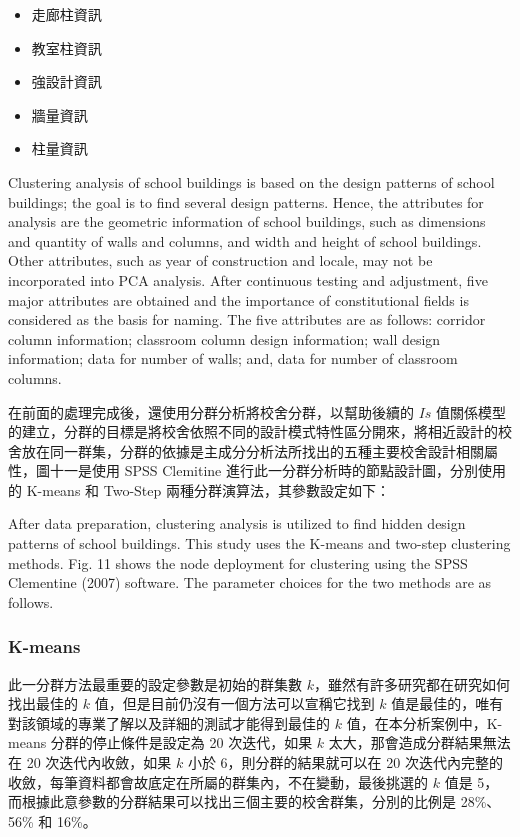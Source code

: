 \begin{itemize}
\item 走廊柱資訊
\item 教室柱資訊
\item 強設計資訊
\item 牆量資訊
\item 柱量資訊
\end{itemize}


Clustering analysis of school buildings is based on the design patterns of school buildings; the goal is to find several design patterns. Hence, the attributes for analysis are the geometric information of school buildings, such as dimensions and quantity of walls and columns, and width and height of school buildings. Other attributes, such as year of construction and locale, may not be incorporated into PCA analysis. After continuous testing and adjustment, five major attributes are obtained and the importance of constitutional fields is considered as the basis for naming. The five attributes are as follows: corridor column information; classroom column design information; wall design information; data for number of walls; and, data for number of classroom columns.



在前面的處理完成後，還使用分群分析將校舍分群，以幫助後續的 $Is$ 值關係模型的建立，分群的目標是將校舍依照不同的設計模式特性區分開來，將相近設計的校舍放在同一群集，分群的依據是主成分分析法所找出的五種主要校舍設計相關屬性，圖十一是使用 SPSS Clemitine 進行此一分群分析時的節點設計圖，分別使用的 K-means 和 Two-Step 兩種分群演算法，其參數設定如下：

After data preparation, clustering analysis is utilized to find hidden design patterns of school buildings. This study uses the K-means and two-step clustering methods. Fig. 11 shows the node deployment for clustering using the SPSS Clementine (2007) software. The parameter choices for the two methods are as follows.

\subsubsection{K-means}

此一分群方法最重要的設定參數是初始的群集數 $k$，雖然有許多研究都在研究如何找出最佳的 $k$ 值，但是目前仍沒有一個方法可以宣稱它找到 $k$ 值是最佳的，唯有對該領域的專業了解以及詳細的測試才能得到最佳的 $k$ 值，在本分析案例中，K-means 分群的停止條件是設定為 20 次迭代，如果 $k$ 太大，那會造成分群結果無法在 20 次迭代內收斂，如果 $k$ 小於 6，則分群的結果就可以在 20 次迭代內完整的收斂，每筆資料都會故底定在所屬的群集內，不在變動，最後挑選的 $k$ 值是 5，而根據此意參數的分群結果可以找出三個主要的校舍群集，分別的比例是 28\%、56\% 和 16\%。


